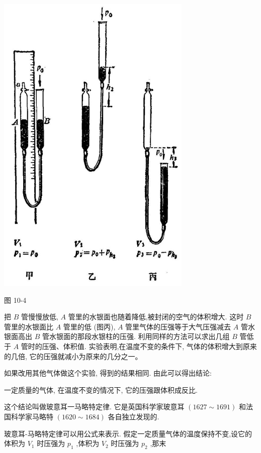 \documentclass[10pt]{article}
\begin{document}
\begin{center}
\includegraphics[max width=0.7\textwidth]{images/01912d55-147c-70aa-b0e0-1782a122f948_283_335110.jpg}
\end{center}

图 10-4

把 \(B\) 管慢慢放低, \(A\) 管里的水银面也随着降低,被封闭的空气的体积增大. 这时 \(B\) 管里的水银面比 \(A\) 管里的低 (图丙), \(A\) 管里气体的压强等于大气压强减去 \(A\) 管水银面高出 \(B\) 管水银面的那段水银柱的压强. 利用同样的方法可以求出几组 \(B\) 管低于 \(A\) 管时的压强、体积值. 实验表明,在温度不变的条件下, 气体的体积增大到原来的几倍, 它的压强就减小为原来的几分之一。

如果改用其他气体做这个实验, 得到的结果相同. 由此可以得出结论:

一定质量的气体, 在温度不变的情况下, 它的压强跟体积成反比.

这个结论叫做玻意耳一马略特定律. 它是英国科学家玻意耳 \(\left( {{1627} \sim {1691}}\right)\) 和法国科学家马略特 \(\left( {{1620} \sim {1684}}\right)\) 各自独立发现的.

玻意耳-马略特定律可以用公式来表示. 假定一定质量气体的温度保持不变,设它的体积为 \({V}_{1}\) 时压强为 \({p}_{1}\) ,体积为 \({V}_{2}\) 时压强为 \({p}_{2}\) ,那末
\end{document}
